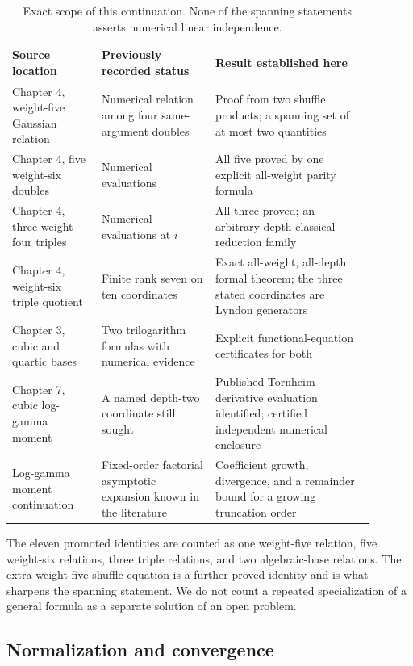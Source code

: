 \begin{table}[htbp]
\centering\small
\begin{tabular}{>{\raggedright\arraybackslash}p{0.22\linewidth}>{\raggedright\arraybackslash}p{0.28\linewidth}>{\raggedright\arraybackslash}p{0.39\linewidth}}
\toprule
Source location & Previously recorded status & Result established here\\
\midrule
Chapter 4, weight-five Gaussian relation
& Numerical relation among four same-argument doubles
& Proof from two shuffle products; a spanning set of at most two quantities\\
\addlinespace
Chapter 4, five weight-six doubles
& Numerical evaluations
& All five proved by one explicit all-weight parity formula\\
\addlinespace
Chapter 4, three weight-four triples
& Numerical evaluations at \(i\)
& All three proved; an arbitrary-depth classical-reduction family\\
\addlinespace
Chapter 4, weight-six triple quotient
& Finite rank seven on ten coordinates
& Exact all-weight, all-depth formal theorem; the three stated coordinates are Lyndon generators\\
\addlinespace
Chapter 3, cubic and quartic bases
& Two trilogarithm formulas with numerical evidence
& Explicit functional-equation certificates for both\\
\addlinespace
Chapter 7, cubic log-gamma moment
& A named depth-two coordinate still sought
& Published Tornheim-derivative evaluation identified; certified independent numerical enclosure\\
\addlinespace
Log-gamma moment continuation
& Fixed-order factorial asymptotic expansion known in the literature
& Coefficient growth, divergence, and a remainder bound for a growing truncation order\\
\bottomrule
\end{tabular}
\caption{Exact scope of this continuation. None of the spanning statements
asserts numerical linear independence.}
\label{tab:status}
\end{table}

The eleven promoted identities are counted as one weight-five relation,
five weight-six relations, three triple relations, and two algebraic-base
relations. The extra weight-five shuffle equation is a further proved
identity and is what sharpens the spanning statement.
We do not count a repeated specialization of a general formula as a
separate solution of an open problem.

\subsection{Normalization and convergence}

